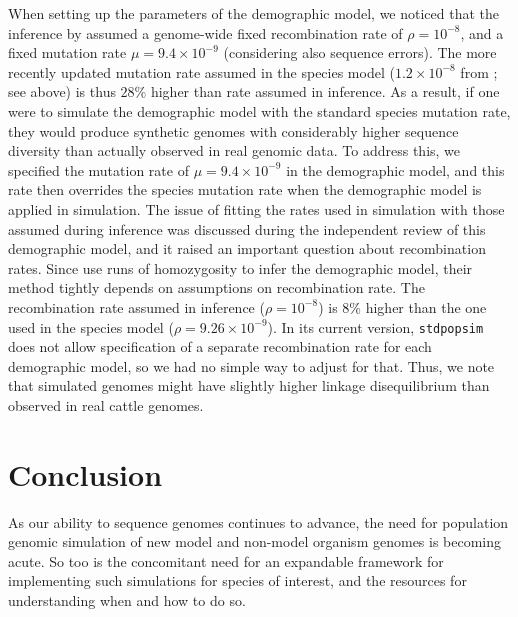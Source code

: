 \documentclass{article}
\newcommand{\stdpopsim}{\texttt{stdpopsim}\xspace}
\begin{document}
When setting up the parameters of the demographic model, we noticed that the inference by \cite{MacLeod2013} assumed a genome-wide fixed recombination rate of \(\rho=10^{-8}\), and a fixed mutation rate \(\mu=9.4 \times 10^{-9}\) (considering also sequence errors).
%
The more recently updated mutation rate assumed in the species model (\(1.2\times 10^{-8}\) from  \citep{Harland2017}; see above) is thus \(28\%\) higher than rate assumed in inference.
%
As a result, if one were to simulate the demographic model with the standard species mutation rate, they would produce synthetic genomes with considerably higher sequence diversity than actually observed in real genomic data.
%
To address this, we specified the mutation rate of \(\mu=9.4 \times 10^{-9}\) in the demographic model, and this rate then overrides the species mutation rate when the demographic model is applied in simulation.
%
%
The issue of fitting the rates used in simulation with those assumed during inference was discussed during the independent review of this demographic model, and it raised an important question about recombination rates. Since \cite{MacLeod2013} use runs of homozygosity to infer the demographic model, their method tightly depends on assumptions on recombination rate. The recombination rate assumed in inference (\(\rho=10^{-8}\)) is \(8\%\) higher than the one used in the species model (\(\rho=9.26\times 10^{-9}\)). In its current version, \texttt{\stdpopsim} does not allow specification of a separate recombination rate for each demographic model, so we had no simple way to adjust for that. Thus, we note that simulated genomes might have slightly higher linkage disequilibrium than observed in real cattle genomes.

\hypertarget{conclusion}{%
\section*{Conclusion}\label{conclusion}}

As our ability to sequence genomes continues to advance, the need for
population genomic simulation of new model and non-model organism genomes is
becoming acute. So too is the concomitant need for an expandable framework
for implementing such simulations for species of interest, and
the resources for understanding when and how to do so.
\end{document}
